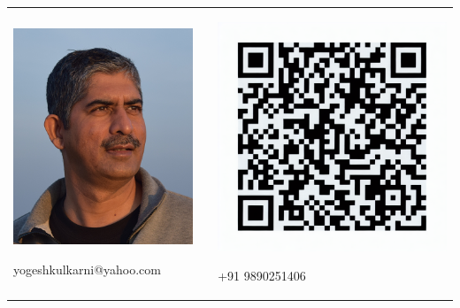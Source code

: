 \documentclass{article}
\begin{document}
\vfill

\begin{tabular}{@{}p{}@{}p{}@{}p{}@{}}
\centering
\includegraphics[width=\linewidth,keepaspectratio]{myphoto} 

yogeshkulkarni@yahoo.com
&
& 
\centering
\includegraphics[width=\linewidth,keepaspectratio]{mylinkedinqr}

+91 9890251406
\end{tabular}
\end{document}

